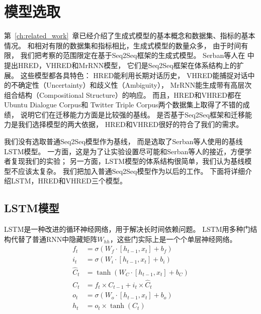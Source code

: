 \section{模型选取}\label{sec:model_selection}
第~\ref{ch:related_work}~章已经介绍了生成式模型的基本概念和数据集、指标的基本情况。
和相对有限的数据集和指标相比，生成式模型的数量众多，
由于时间有限，
我们把考察的范围限定在基于Seq2Seq框架的生成式模型。
Serban等人在
中提出HRED，VHRED和MrRNN模型，
它们是Seq2Seq框架在体系结构上的扩展。
这些模型都各具特色：
HRED能利用长期对话历史，
VHRED能捕捉对话中的不确定性（Uncertainty）和歧义性（Ambiguity），
MrRNN能生成带有高层次组合结构（Compositional Structure）的响应。
而且，HRED和VHRED都在Ubuntu Dialogue Corpus和
Twitter Triple Corpus两个数据集上取得了不错的成绩，
说明它们在迁移能力方面是比较强的基线。
是否基于Seq2Seq框架和迁移能力是我们选择模型的两大依据，
HRED和VHRED很好的符合了我们的需求。

我们没有选取普通Seq2Seq模型作为基线，
而是选取了Serban等人使用的基线LSTM模型。
一方面，这是为了让实验设置尽可能和Serban等人的接近，方便学者复现我们的实验；
另一方面，LSTM模型的体系结构很简单，我们认为基线模型不应该太复杂。
我们把加入普通Seq2Seq模型作为以后的工作。
下面将详细介绍LSTM，HRED和VHRED三个模型。

\subsection{LSTM模型}\label{subsec:LSTM}
LSTM是一种改进的循环神经网络，用于解决长时间依赖问题。
LSTM用多种门结构代替了普通RNN中隐藏矩阵$W_{hh}$，这些门实际上是一个个单层神经网络。
\begin{align}
    f_t &= \sigma(W_f \cdot [h_{t-1}, x_t] + b_f) \\
    i_t &= \sigma(W_i \cdot [h_{t-1}, x_t] + b_i) \\
    \hat{C}_t &= \tanh(W_C \cdot [h_{t-1}, x_t] + b_C) \\
    C_t &= f_t \times C_{t-1} + i_t \times \hat{C}_t \\
    o_t &= \sigma(W_o \cdot [h_{t-1}, x_t] + b_o) \\
    h_t &= o_t \times \tanh(C_t)
    \label{eqn:LSTM_formula}
\end{align}

